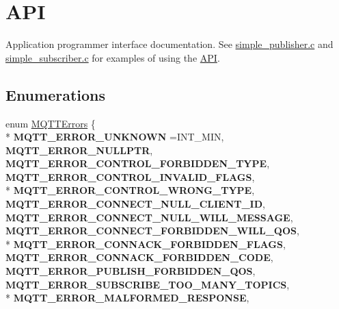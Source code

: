 \hypertarget{group__api}{}\section{A\+PI}
\label{group__api}


Application programmer interface documentation. See \hyperlink{simple_publisher_8c-example}{simple\+\_\+publisher.\+c} and \hyperlink{simple_subscriber_8c-example}{simple\+\_\+subscriber.\+c} for examples of using the \hyperlink{group__api}{A\+PI}.  


\subsection*{Enumerations}
\begin{DoxyCompactItemize}
\item 
enum \hyperlink{group__api_gad0c901a8d30691ed0ca17915b691b7e7}{M\+Q\+T\+T\+Errors} \{ \\*
{\bfseries M\+Q\+T\+T\+\_\+\+E\+R\+R\+O\+R\+\_\+\+U\+N\+K\+N\+O\+WN} =I\+N\+T\+\_\+\+M\+IN, 
{\bfseries M\+Q\+T\+T\+\_\+\+E\+R\+R\+O\+R\+\_\+\+N\+U\+L\+L\+P\+TR}, 
{\bfseries M\+Q\+T\+T\+\_\+\+E\+R\+R\+O\+R\+\_\+\+C\+O\+N\+T\+R\+O\+L\+\_\+\+F\+O\+R\+B\+I\+D\+D\+E\+N\+\_\+\+T\+Y\+PE}, 
{\bfseries M\+Q\+T\+T\+\_\+\+E\+R\+R\+O\+R\+\_\+\+C\+O\+N\+T\+R\+O\+L\+\_\+\+I\+N\+V\+A\+L\+I\+D\+\_\+\+F\+L\+A\+GS}, 
\\*
{\bfseries M\+Q\+T\+T\+\_\+\+E\+R\+R\+O\+R\+\_\+\+C\+O\+N\+T\+R\+O\+L\+\_\+\+W\+R\+O\+N\+G\+\_\+\+T\+Y\+PE}, 
{\bfseries M\+Q\+T\+T\+\_\+\+E\+R\+R\+O\+R\+\_\+\+C\+O\+N\+N\+E\+C\+T\+\_\+\+N\+U\+L\+L\+\_\+\+C\+L\+I\+E\+N\+T\+\_\+\+ID}, 
{\bfseries M\+Q\+T\+T\+\_\+\+E\+R\+R\+O\+R\+\_\+\+C\+O\+N\+N\+E\+C\+T\+\_\+\+N\+U\+L\+L\+\_\+\+W\+I\+L\+L\+\_\+\+M\+E\+S\+S\+A\+GE}, 
{\bfseries M\+Q\+T\+T\+\_\+\+E\+R\+R\+O\+R\+\_\+\+C\+O\+N\+N\+E\+C\+T\+\_\+\+F\+O\+R\+B\+I\+D\+D\+E\+N\+\_\+\+W\+I\+L\+L\+\_\+\+Q\+OS}, 
\\*
{\bfseries M\+Q\+T\+T\+\_\+\+E\+R\+R\+O\+R\+\_\+\+C\+O\+N\+N\+A\+C\+K\+\_\+\+F\+O\+R\+B\+I\+D\+D\+E\+N\+\_\+\+F\+L\+A\+GS}, 
{\bfseries M\+Q\+T\+T\+\_\+\+E\+R\+R\+O\+R\+\_\+\+C\+O\+N\+N\+A\+C\+K\+\_\+\+F\+O\+R\+B\+I\+D\+D\+E\+N\+\_\+\+C\+O\+DE}, 
{\bfseries M\+Q\+T\+T\+\_\+\+E\+R\+R\+O\+R\+\_\+\+P\+U\+B\+L\+I\+S\+H\+\_\+\+F\+O\+R\+B\+I\+D\+D\+E\+N\+\_\+\+Q\+OS}, 
{\bfseries M\+Q\+T\+T\+\_\+\+E\+R\+R\+O\+R\+\_\+\+S\+U\+B\+S\+C\+R\+I\+B\+E\+\_\+\+T\+O\+O\+\_\+\+M\+A\+N\+Y\+\_\+\+T\+O\+P\+I\+CS}, 
\\*
{\bfseries M\+Q\+T\+T\+\_\+\+E\+R\+R\+O\+R\+\_\+\+M\+A\+L\+F\+O\+R\+M\+E\+D\+\_\+\+R\+E\+S\+P\+O\+N\+SE}, 

\end{DoxyCompactItemize}
